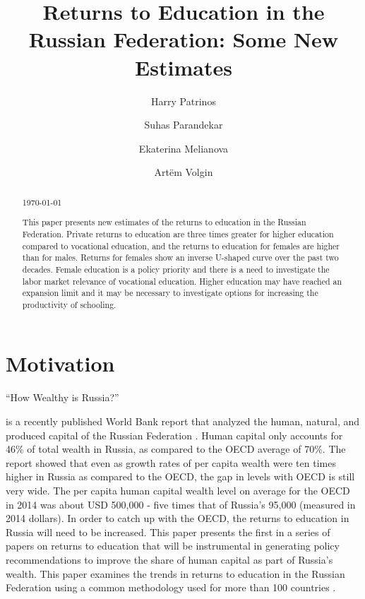 \documentclass[alpha-refs]{wiley-article-01g}
\title{Returns to Education in the Russian Federation: Some New Estimates}
\author[*]{Harry Patrinos}
\author[*]{\hspace{-1em}Suhas Parandekar}
\author[*]{\hspace{-1em}Ekaterina Melianova}
\author[*]{\hspace{-1em}Art\"{e}m Volgin}
\affil[*]{Education Global Practice, Europe and Central Asia}
\begin{document}
\maketitle

\begin{abstract}
	
\vspace{.5em} \today	

This paper presents new estimates of the returns to education in the Russian Federation. Private returns to education are three times greater for higher education compared to vocational education, and the returns to education for females are higher than for males. Returns for females show an inverse U-shaped curve over the past two decades. Female education is a policy priority and there is a need to investigate the labor market relevance of vocational education. Higher education may have reached an expansion limit and it may be necessary to investigate options for increasing the productivity of schooling.

\end{abstract}




\section{Motivation}

\begin{em}``How Wealthy is Russia?''\end{em} \hspace{-0.10em}is a recently published World Bank report that analyzed the human, natural, and produced capital of the Russian Federation \parencite{Naikal2019}. Human capital only accounts for 46\% of total wealth in Russia, as compared to the OECD average of 70\%.  The report showed that even as growth rates of per capita wealth were ten times higher in Russia as compared to the OECD, the gap in levels with OECD is still very wide. The per capita human capital wealth level on average for the OECD in 2014 was about USD 500,000 - five times that of Russia's 95,000 (measured in 2014 dollars). In order to catch up with the OECD, the returns to education in Russia will need to be increased. This paper presents the first in a series of papers on returns to education that will be instrumental in generating policy recommendations to improve the share of human capital as part of Russia's wealth. This paper examines the trends in returns to education in the Russian Federation using a common methodology used for more than 100 countries \parencite{Montenegro_Patrinos2014,Psacharopoulos_Patrinos2018}.  
\end{document}
